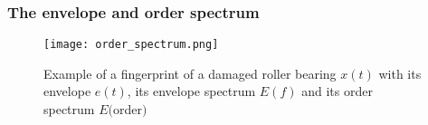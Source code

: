 \begin{frame}
    \frametitle{The envelope and order spectrum}
    \small
    
    \begin{figure}
        \centering
        \texttt{[image: order\_spectrum.png]}
        \caption{Example of a fingerprint of a damaged roller bearing $x(t)$ with its envelope $e(t)$, its envelope spectrum $E(f)$ and its order spectrum $E($order$)$}
        \label{fig:order_spectrum}
    \end{figure}
   
\end{frame}